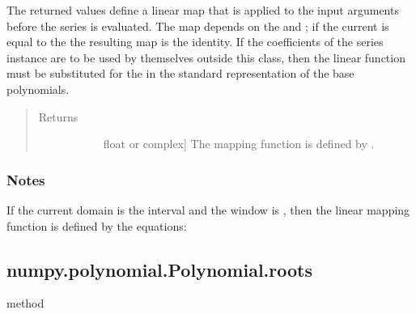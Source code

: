 \documentclass[letterpaper,10pt,english]{sphinxmanual}
\begin{document}
\begin{fulllineitems}
\begin{fulllineitems}
The returned values define a linear map  that is
applied to the input arguments before the series is evaluated. The
map depends on the  and ; if the current
 is equal to the  the resulting map is the
identity.  If the coefficients of the series instance are to be
used by themselves outside this class, then the linear function
must be substituted for the  in the standard representation of
the base polynomials.
\begin{quote}\begin{description}
\item[{Returns}] \leavevmode\begin{description}
\item[{}] \leavevmode{[}float or complex{]}
The mapping function is defined by .

\end{description}

\end{description}\end{quote}
\subsubsection*{Notes}

If the current domain is the interval \sphinxcode{\sphinxupquote{{[}l1, r1{]}}} and the window
is \sphinxcode{\sphinxupquote{{[}l2, r2{]}}}, then the linear mapping function  is
defined by the equations:

\begin{sphinxVerbatim}[commandchars=\\\{\}]
  
  
\end{sphinxVerbatim}

\end{fulllineitems}



\subsection{numpy.polynomial.Polynomial.roots}
\label{\detokenize{generated/generated/numpy.polynomial.Polynomial.roots:numpy-polynomial-polynomial-roots}}\label{\detokenize{generated/generated/numpy.polynomial.Polynomial.roots::doc}}
method


\end{fulllineitems}
\end{document}
